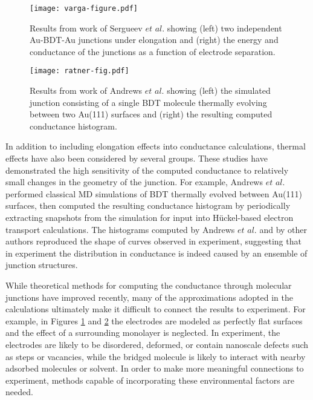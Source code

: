 \documentclass[10pt]{report}  %
\begin{document}
%
% 
%
\begin{figure}[t!]
	\centering
	\texttt{[image: varga-figure.pdf]}
	\caption{Results from work of Sergueev $et$ $al.$ \protect\cite{Sergueev:2010} showing (left) two independent Au-BDT-Au junctions under elongation and (right) the energy and conductance of the junctions as a function of electrode separation. }
	\label{fig:varga-figure}
\end{figure}    

%
% 
%
\begin{figure}[h!]
	\centering
	\texttt{[image: ratner-fig.pdf]}
	\caption{Results from work of Andrews $et$ $al.$ \protect\cite{Andrews:2008} showing (left) the simulated junction consisting of a single BDT molecule thermally evolving between two Au(111) surfaces and (right) the resulting computed conductance histogram.  }
	\label{fig:ratner-fig}
\end{figure}    

In addition to including elongation effects into conductance calculations, thermal effects have also been considered by several groups. \cite{Andrews:2008,Cao:2008,Maul:2009,Kim:2010} These studies have demonstrated the high sensitivity of the computed conductance to relatively small changes in the geometry of the junction. For example, Andrews $et$ $al.$ \cite{Andrews:2008} performed classical MD simulations of BDT thermally evolved between Au(111) surfaces, then computed the resulting conductance histogram by periodically extracting snapshots from the simulation for input into H\"{u}ckel-based electron transport calculations. The histograms computed by Andrews $et$ $al.$ \cite{Andrews:2008} and by other authors \cite{Cao:2008,Maul:2009,Kim:2010} reproduced the shape of curves observed in experiment, suggesting that in experiment the distribution in conductance is indeed caused by an ensemble of junction structures.

While theoretical methods for computing the conductance through molecular junctions have improved recently, many of the approximations adopted in the calculations ultimately make it difficult to connect the results to experiment. For example, in Figures \ref{fig:varga-figure} and \ref{fig:ratner-fig} the electrodes are modeled as perfectly flat surfaces and the effect of a surrounding monolayer is neglected. In experiment, the electrodes are likely to be disordered, deformed, or contain nanoscale defects such as steps or vacancies, \cite{Huang:2007,Frei:2012} while the bridged molecule is likely to interact with nearby adsorbed molecules or solvent. \cite{Fatemi:2011} In order to make more meaningful connections to experiment, methods capable of incorporating these environmental factors are needed.
\end{document}
